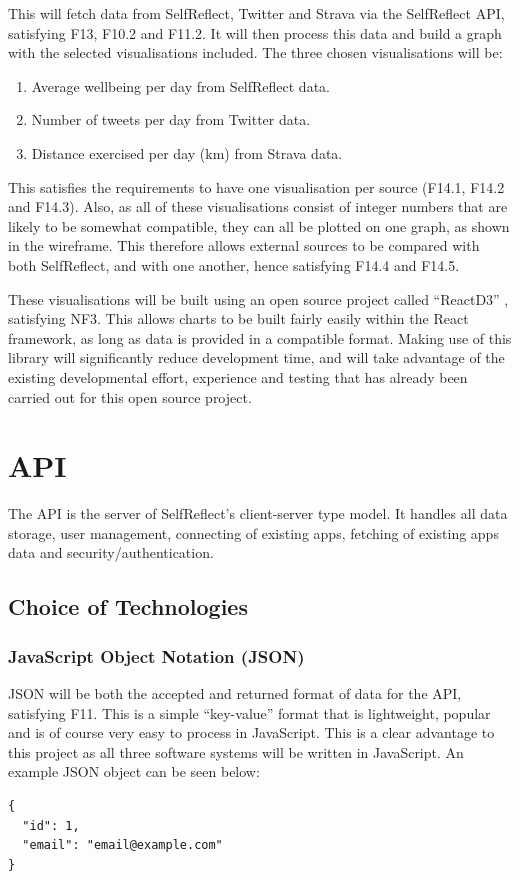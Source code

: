 \documentclass[11pt,openright,a4paper]{report}
\begin{document}
\newpage
This will fetch data from SelfReflect, Twitter and Strava via the SelfReflect API, satisfying F13, F10.2 and F11.2. It will then process this data and build a graph with the selected visualisations included. The three chosen visualisations will be:
\begin{enumerate}
\item Average wellbeing per day from SelfReflect data.
\item Number of tweets per day from Twitter data.
\item Distance exercised per day (km) from Strava data.
\end{enumerate}

This satisfies the requirements to have one visualisation per source (F14.1, F14.2 and F14.3). Also, as all of these visualisations consist of integer numbers that are likely to be somewhat compatible, they can all be plotted on one graph, as shown in the wireframe. This therefore allows external sources to be compared with both SelfReflect, and with one another, hence satisfying F14.4 and F14.5.

These visualisations will be built using an open source project called \enquote{ReactD3} \parencite{reactd3}, satisfying NF3. This allows charts to be built fairly easily within the React framework, as long as data is provided in a compatible format. Making use of this library will significantly reduce development time, and will take advantage of the existing developmental effort, experience and testing that has already been carried out for this open source project.

\section{API}
The API is the server of SelfReflect's client-server type model. It handles all data storage, user management, connecting of existing apps, fetching of existing apps data and security/authentication.

\subsection{Choice of Technologies}
\subsubsection{JavaScript Object Notation (JSON)}
JSON will be both the accepted and returned format of data for the API, satisfying F11. This is a simple \enquote{key-value} format that is lightweight, popular and is of course very easy to process in JavaScript. This is a clear advantage to this project as all three software systems will be written in JavaScript. An example JSON object can be seen below:
\begin{lstlisting}
{
  "id": 1,
  "email": "email@example.com"
}
\end{lstlisting}
\end{document}
